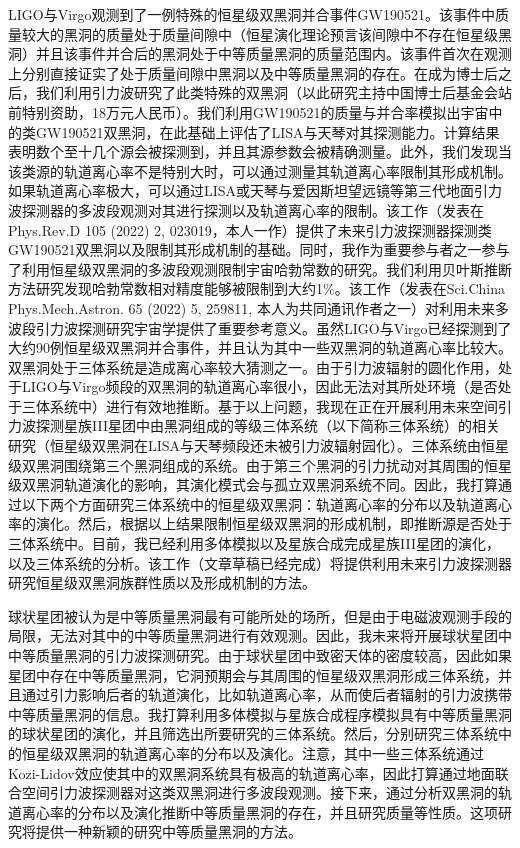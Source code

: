 \documentclass[12pt,a4paper,sans]{article}%
\begin{document}
\begin{CJK}{UTF8}{gbsn}
LIGO与Virgo观测到了一例特殊的恒星级双黑洞并合事件GW190521。该事件中质量较大的黑洞的质量处于质量间隙中（恒星演化理论预言该间隙中不存在恒星级黑洞）并且该事件并合后的黑洞处于中等质量黑洞的质量范围内。该事件首次在观测上分别直接证实了处于质量间隙中黑洞以及中等质量黑洞的存在。在成为博士后之后，我们利用引力波研究了此类特殊的双黑洞（以此研究主持中国博士后基金会站前特别资助，18万元人民币）。我们利用GW190521的质量与并合率模拟出宇宙中的类GW190521双黑洞，在此基础上评估了LISA与天琴对其探测能力。计算结果表明数个至十几个源会被探测到，并且其源参数会被精确测量。此外，我们发现当该类源的轨道离心率不是特别大时，可以通过测量其轨道离心率限制其形成机制。如果轨道离心率极大，可以通过LISA或天琴与爱因斯坦望远镜等第三代地面引力波探测器的多波段观测对其进行探测以及轨道离心率的限制。该工作（发表在Phys.Rev.D
    105 (2022) 2,
    023019，本人一作）提供了未来引力波探测器探测类GW190521双黑洞以及限制其形成机制的基础。同时，我作为重要参与者之一参与了利用恒星级双黑洞的多波段观测限制宇宙哈勃常数的研究。我们利用贝叶斯推断方法研究发现哈勃常数相对精度能够被限制到大约1\%。该工作（发表在Sci.China
    Phys.Mech.Astron. 65 (2022) 5, 259811,
    本人为共同通讯作者之一）对利用未来多波段引力波探测研究宇宙学提供了重要参考意义。虽然LIGO与Virgo已经探测到了大约90例恒星级双黑洞并合事件，并且认为其中一些双黑洞的轨道离心率比较大。双黑洞处于三体系统是造成离心率较大猜测之一。由于引力波辐射的圆化作用，处于LIGO与Virgo频段的双黑洞的轨道离心率很小，因此无法对其所处环境（是否处于三体系统中）进行有效地推断。基于以上问题，我现在正在开展利用未来空间引力波探测星族III星团中由黑洞组成的等级三体系统（以下简称三体系统）的相关研究（恒星级双黑洞在LISA与天琴频段还未被引力波辐射园化）。三体系统由恒星级双黑洞围绕第三个黑洞组成的系统。由于第三个黑洞的引力扰动对其周围的恒星级双黑洞轨道演化的影响，其演化模式会与孤立双黑洞系统不同。因此，我打算通过以下两个方面研究三体系统中的恒星级双黑洞：轨道离心率的分布以及轨道离心率的演化。然后，根据以上结果限制恒星级双黑洞的形成机制，即推断源是否处于三体系统中。目前，我已经利用多体模拟以及星族合成完成星族III星团的演化，以及三体系统的分析。该工作（文章草稿已经完成）将提供利用未来引力波探测器研究恒星级双黑洞族群性质以及形成机制的方法。

球状星团被认为是中等质量黑洞最有可能所处的场所，但是由于电磁波观测手段的局限，无法对其中的中等质量黑洞进行有效观测。因此，我未来将开展球状星团中中等质量黑洞的引力波探测研究。由于球状星团中致密天体的密度较高，因此如果星团中存在中等质量黑洞，它洞预期会与其周围的恒星级双黑洞形成三体系统，并且通过引力影响后者的轨道演化，比如轨道离心率，从而使后者辐射的引力波携带中等质量黑洞的信息。我打算利用多体模拟与星族合成程序模拟具有中等质量黑洞的球状星团的演化，并且筛选出所要研究的三体系统。然后，分别研究三体系统中的恒星级双黑洞的轨道离心率的分布以及演化。注意，其中一些三体系统通过Kozi-Lidov效应使其中的双黑洞系统具有极高的轨道离心率，因此打算通过地面联合空间引力波探测器对这类双黑洞进行多波段观测。接下来，通过分析双黑洞的轨道离心率的分布以及演化推断中等质量黑洞的存在，并且研究质量等性质。这项研究将提供一种新颖的研究中等质量黑洞的方法。


\end{CJK}
\end{document}
